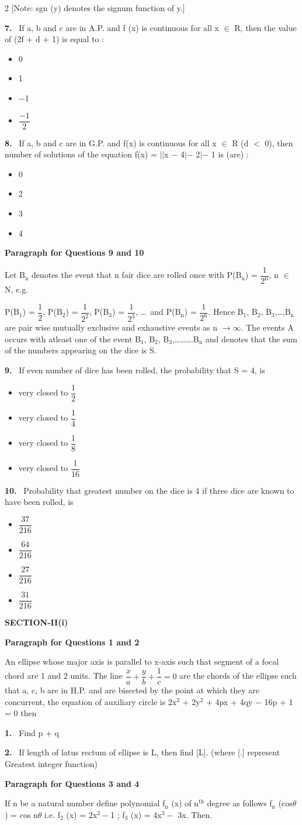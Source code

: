 \documentclass[10pt]{extarticle}
\newcommand{\sect}[1]{\par\smallskip\noindent\textbf{#1}\par}
\newcommand{\qn}[1]{\par\smallskip\noindent\textbf{#1.}~}
\newcommand{\paraq}[2]{\par\smallskip\noindent\textbf{Paragraph for Questions #1 and #2}\par}
\newenvironment{qoptions}{\begin{itemize}[leftmargin=1.8em,itemsep=1pt,topsep=2pt,label={}]}{\end{itemize}}
\newcommand{\opt}[2]{\item[(#1)] #2}
\begin{document}
\begin{multicols}{2}
[Note: sgn (y) denotes the signum function of y.]
\qn{7} If a, b and c are in A.P. and f (x) is continuous for all x $\in$ R, then the value of (2f + d + 1) is equal to :
\begin{qoptions}
\opt{A}{0}
\opt{B}{1}
\opt{C}{$-$1}
\opt{D}{$\dfrac{-1}2$}
\end{qoptions}
\qn{8} If a, b and c are in G.P. and f(x) is continuous for all x $\in$ R (d $<$ 0), then number of solutions of the equation f(x) = $||$x $-$ 4$|-$ 2$|-$ 1 is (are) :
\begin{qoptions}
\opt{A}{0}
\opt{B}{2}
\opt{C}{3}
\opt{D}{4}
\end{qoptions}
\paraq{9}{10}
Let B$_\mathrm n$ denotes the event that n fair dice are rolled once with P(B$_\mathrm n$) = $\dfrac1{2^\mathrm n}$, n $\in$ N, e.g.\par
P(B$_1$) = $\dfrac12$, P(B$_2$) = $\dfrac1{2^2}$, P(B$_3$) = $\dfrac1{2^3}$, \ldots\ and P(B$_\mathrm n$) = $\dfrac1{2^\mathrm n}$. Hence B$_1$, B$_2$, B$_3$,\ldots,B$_\mathrm n$ are pair wise mutually exclusive and exhaustive events as n $\to\infty$. The events A occurs with atleast one of the event B$_1$, B$_2$, B$_3$,\ldots\ldots\ldots.B$_\mathrm n$ and denotes that the sum of the numbers appearing on the dice is S.
\qn{9} If even number of dice has been rolled, the probability that S = 4, is
\begin{qoptions}
\opt{A}{very closed to $\dfrac12$}
\opt{B}{very closed to $\dfrac14$}
\opt{C}{very closed to $\dfrac18$}
\opt{D}{very closed to $\dfrac1{16}$}
\end{qoptions}
\qn{10} Probability that greatest number on the dice is 4 if three dice are known to have been rolled, is
\begin{qoptions}
\opt{A}{$\dfrac{37}{216}$}
\opt{B}{$\dfrac{64}{216}$}
\opt{C}{$\dfrac{27}{216}$}
\opt{D}{$\dfrac{31}{216}$}
\end{qoptions}
\sect{SECTION-II(i)}
\paraq{1}{2}
An ellipse whose major axis is parallel to x-axis such that segment of a focal chord are 1 and 2 units. The line $\dfrac xa+\dfrac yb+\dfrac1c=0$ are the chords of the ellipse such that a, c, b are in H.P. and are bisected by the point at which they are concurrent, the equation of auxiliary circle is 2x$^2$ + 2y$^2$ + 4px + 4qy $-$ 16p + 1 = 0 then
\qn{1} Find p + q
\qn{2} If length of latus rectum of ellipse is L, then find [L]. (where [.] represent Greatest integer function)
\paraq{3}{4}
If n be a natural number define polynomial f$_\mathrm n$ (x) of n$^{\mathrm{th}}$ degree as follows f$_\mathrm n$ (cos$\theta$) = cos n$\theta$ i.e. f$_2$ (x) = 2x$^2-$1 ; f$_3$ (x) = 4x$^3-$ 3x. Then.

\end{multicols}
\end{document}
